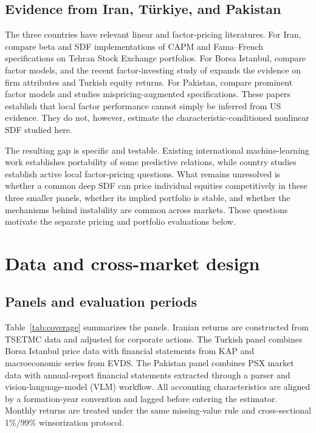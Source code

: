 \documentclass[12pt]{article}
\begin{document}
\subsection{Evidence from Iran, T\"urkiye, and Pakistan}

The three countries have relevant linear and factor-pricing literatures. For Iran, \citet{talakesh2022} compare beta and SDF implementations of CAPM and Fama--French specifications on Tehran Stock Exchange portfolios. For Borsa Istanbul, \citet{azimli2020} compare factor models, and the recent factor-investing study of \citet{gokcen2026} expands the evidence on firm attributes and Turkish equity returns. For Pakistan, \citet{alikj2021} compare prominent factor models and \citet{ali2022} studies mispricing-augmented specifications. These papers establish that local factor performance cannot simply be inferred from US evidence. They do not, however, estimate the characteristic-conditioned nonlinear SDF studied here.

The resulting gap is specific and testable. Existing international machine-learning work establishes portability of some predictive relations, while country studies establish active local factor-pricing questions. What remains unresolved is whether a common deep SDF can price individual equities competitively in these three smaller panels, whether its implied portfolio is stable, and whether the mechanisms behind instability are common across markets. Those questions motivate the separate pricing and portfolio evaluations below.

\section{Data and cross-market design}\label{sec:data}

\subsection{Panels and evaluation periods}\label{sec:coverage}

Table~\ref{tab:coverage} summarizes the panels. Iranian returns are constructed from TSETMC data and adjusted for corporate actions. The Turkish panel combines Borsa Istanbul price data with financial statements from KAP and macroeconomic series from EVDS. The Pakistan panel combines PSX market data with annual-report financial statements extracted through a parser and vision-language-model (VLM) workflow. All accounting characteristics are aligned by a formation-year convention and lagged before entering the estimator. Monthly returns are treated under the same missing-value rule and cross-sectional 1\%/99\% winsorization protocol.
\end{document}
